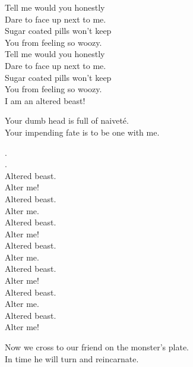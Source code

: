 
Tell me would you honestly \\
Dare to face up next to me. \\
Sugar coated pills won't keep \\
You from feeling so woozy. \\

Tell me would you honestly \\
Dare to face up next to me. \\
Sugar coated pills won't keep \\
You from feeling so woozy. \\

I am an altered beast! \\





Your dumb  head is full of naiveté. \\
Your impending fate is to be one with me. \\


 . \\
. \\
Altered beast. \\
Alter me! \\

Altered beast. \\
Alter me. \\
Altered beast. \\
Alter me! \\

Altered beast. \\
Alter me. \\
Altered beast. \\
Alter me! \\

Altered beast. \\
Alter me. \\
Altered beast. \\
Alter me! \\


Now we cross to our friend on the monster's plate. \\
In time he will turn and reincarnate. \\

